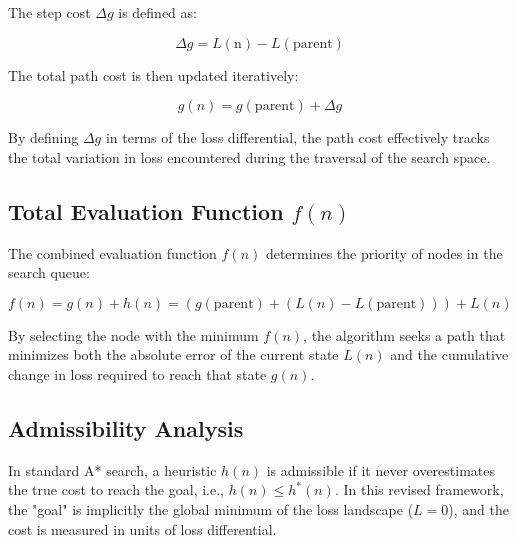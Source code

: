 The step cost $\Delta g$ is defined as:

$$\Delta g = L(\text{n}) - L(\text{parent})$$

The total path cost is then updated iteratively:

$$g(n) = g(\text{parent}) + \Delta g$$

By defining $\Delta g$ in terms of the loss differential, the path cost effectively tracks the total variation in loss encountered during the traversal of the search space.

\subsection{Total Evaluation Function $f(n)$}
The combined evaluation function $f(n)$ determines the priority of nodes in the search queue:

$$f(n) = g(n) + h(n) = \left( g(\text{parent}) + (L(n) - L(\text{parent})) \right) + L(n)$$

By selecting the node with the minimum $f(n)$, the algorithm seeks a path that minimizes both the absolute error of the current state $L(n)$ and the cumulative change in loss required to reach that state $g(n)$.
\subsection{Admissibility Analysis}

In standard A* search, a heuristic $h(n)$ is admissible if it never overestimates the true cost to reach the goal, i.e., $h(n) \le h^*(n)$. In this revised framework, the "goal" is implicitly the global minimum of the loss landscape ($L=0$), and the cost is measured in units of loss differential.

